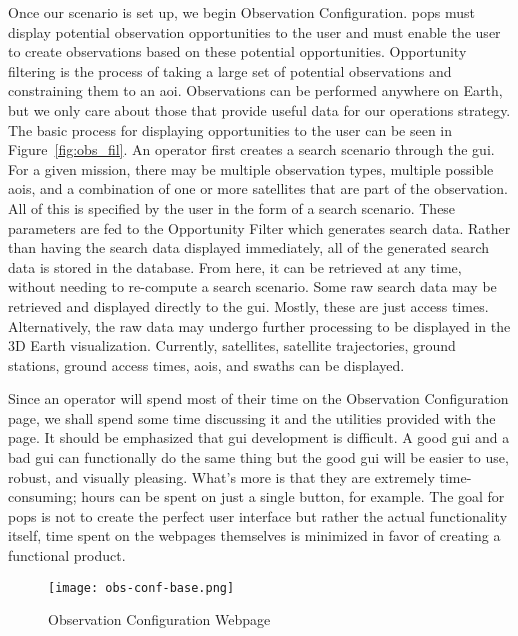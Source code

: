 Once our scenario is set up, we begin Observation Configuration. \gls{pops}
must display potential observation opportunities to the user and must enable
the user to create observations based on these potential opportunities.
Opportunity filtering is the process of taking a large set of potential
observations and constraining them to an \gls{aoi}. Observations can be
performed anywhere on Earth, but we only care about those that provide useful
data for our operations strategy.  The basic process for displaying
opportunities to the user can be seen in Figure~\ref{fig:obs_fil}. An operator
first creates a search scenario through the \gls{gui}.  For a given mission,
there may be multiple observation types, multiple possible \glspl{aoi}, and a
combination of one or more satellites that are part of the observation. All of
this is specified by the user in the form of a search scenario. These
parameters are fed to the Opportunity Filter which generates search data.
Rather than having the search data displayed immediately, all of the generated
search data is stored in the database. From here, it can be retrieved at any
time, without needing to re-compute a search scenario. Some raw search data may
be retrieved and displayed directly to the \gls{gui}. Mostly, these are just
access times.  Alternatively, the raw data may undergo further processing to be
displayed in the 3D Earth visualization. Currently, satellites, satellite
trajectories, ground stations, ground access times, \glspl{aoi}, and swaths can
be displayed.


Since an operator will spend most of their time on the Observation
Configuration page, we shall spend some time discussing it and the utilities
provided with the page. It should be emphasized that \gls{gui}  development is
difficult. A good \gls{gui} and a bad \gls{gui} can functionally do the same
thing but the good \gls{gui} will be easier to use, robust, and visually
pleasing. What's more is that they are extremely time-consuming; hours can be
spent on just a single button, for example. The goal for \gls{pops} is not to
create the perfect user interface but rather the actual functionality itself,
time spent on the webpages themselves is minimized in favor of creating a
functional product. 

\begin{figure}
    \centering
    \texttt{[image: obs-conf-base.png]} 
    \caption{Observation Configuration Webpage}
    \label{fig:obs-conf-base} 
\end{figure}


